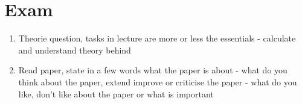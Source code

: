 \documentclass[12pt]{extreport} %
\theoremstyle{named}
\theoremstyle{nnamed}
\theoremstyle{itshape}
\theoremstyle{normal}
\begin{document}
  
\newpage 
  
\section*{Exam}  
  
\begin{enumerate}
	\item Theorie question, tasks in lecture are more or less the essentials - calculate and understand theory behind
	\item Read paper, state in a few words what the paper is about - what do you think about the paper, extend improve or criticise the paper - what do you like, don't like about the paper or what is important 
\end{enumerate}  
  
\end{document}
